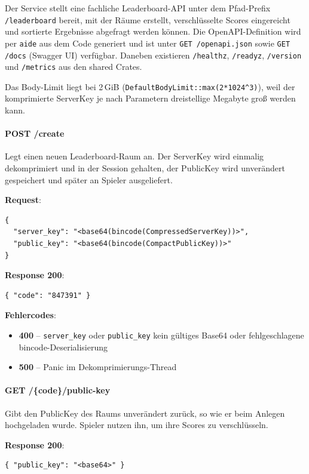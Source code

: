 Der Service stellt eine fachliche Leaderboard-API unter dem Pfad-Prefix \texttt{/leaderboard} bereit, mit der Räume erstellt, verschlüsselte Scores eingereicht und sortierte Ergebnisse abgefragt werden können. Die OpenAPI-Definition wird per \texttt{aide} aus dem Code generiert und ist unter \texttt{GET /openapi.json} sowie \texttt{GET /docs} (Swagger UI) verfügbar. Daneben existieren \texttt{/healthz}, \texttt{/readyz}, \texttt{/version} und \texttt{/metrics} aus den shared Crates.

Das Body-Limit liegt bei 2\,GiB (\texttt{DefaultBodyLimit::max(2*1024\textasciicircum 3)}), weil der komprimierte ServerKey je nach Parametern dreistellige Megabyte groß werden kann.

\paragraph{POST /create}

Legt einen neuen Leaderboard-Raum an. Der ServerKey wird einmalig dekomprimiert und in der Session gehalten, der PublicKey wird unverändert gespeichert und später an Spieler ausgeliefert.

\textbf{Request}:
\begin{lstlisting}
{
  "server_key": "<base64(bincode(CompressedServerKey))>",
  "public_key": "<base64(bincode(CompactPublicKey))>"
}
\end{lstlisting}

\textbf{Response 200}:
\begin{lstlisting}
{ "code": "847391" }
\end{lstlisting}

\textbf{Fehlercodes}:
\begin{itemize}
    \item \textbf{400} -- \texttt{server\_key} oder \texttt{public\_key} kein gültiges Base64 oder fehlgeschlagene bincode-Deserialisierung
    \item \textbf{500} -- Panic im Dekomprimierungs-Thread
\end{itemize}

\paragraph{GET /\{code\}/public-key}

Gibt den PublicKey des Raums unverändert zurück, so wie er beim Anlegen hochgeladen wurde. Spieler nutzen ihn, um ihre Scores zu verschlüsseln.

\textbf{Response 200}:
\begin{lstlisting}
{ "public_key": "<base64>" }
\end{lstlisting}

